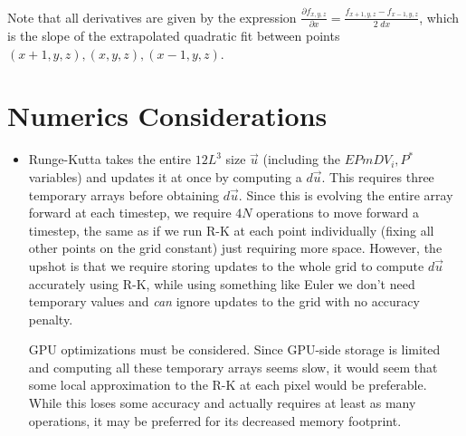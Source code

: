 \documentclass[10pt]{article}
\newcommand{\pd}[2]{\frac{\partial#1}{\partial#2}}
\begin{document}
Note that all derivatives are given by the expression $\pd{f_{x,y,z}}{x} = \frac{f_{x+1,y,z} - f_{x-1,y,z}}{2\;dx}$, which is the slope of the extrapolated quadratic fit between points $(x+1,y,z),(x,y,z),(x-1,y,z)$.

\section{Numerics Considerations}

\begin{itemize}
    \item Runge-Kutta takes the entire $12L^3$ size $\vec{u}$ (including the $EPmDV_i, P^*$ variables) and updates it at once by computing a $d\vec{u}$. This requires three temporary arrays before obtaining $d\vec{u}$. Since this is evolving the entire array forward at each timestep, we require $4N$ operations to move forward a timestep, the same as if we run R-K at each point individually (fixing all other points on the grid constant) just requiring more space. However, the upshot is that we require storing updates to the whole grid to compute $d\vec{u}$ accurately using R-K, while using something like Euler we don't need temporary values and \emph{can} ignore updates to the grid with no accuracy penalty.

        GPU optimizations must be considered. Since GPU-side storage is limited and computing all these temporary arrays seems slow, it would seem that some local approximation to the R-K at each pixel would be preferable. While this loses some accuracy and actually requires at least as many operations, it may be preferred for its decreased memory footprint.
\end{itemize}
\end{document}
